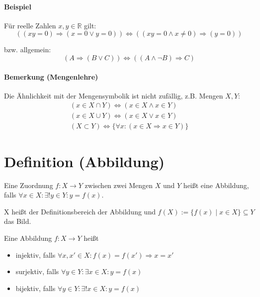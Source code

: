\paragraph{Beispiel}
	Für reelle Zahlen $x,y\in\mathbb{R}$ gilt:
	\begin{equation*}
		\left((xy = 0)\Rightarrow (x=0 \lor y=0)\right) \Leftrightarrow \left((xy=0 \land x \neq 0)\Rightarrow (y =0)\right)
	\end{equation*}
	
	bzw. allgemein:
	\begin{equation*}
		(A\Rightarrow (B\lor C))\Leftrightarrow ((A\land\lnot B)\Rightarrow C)
	\end{equation*}

\paragraph{Bemerkung (Mengenlehre)}
	Die Ähnlichkeit mit der Mengensymbolik ist nicht zufällig, z.B. Mengen $X, Y$:
	\begin{gather*}
		(x\in X\cap Y)\Leftrightarrow (x\in X\land x\in Y)\\
		(x\in X\cup Y)\Leftrightarrow (x\in X\lor x\in Y)\\
		(X\subset Y) \Leftrightarrow \{\forall x : (x\in X \Rightarrow x\in Y)\}
	\end{gather*}

\section*{Definition (Abbildung)}
	\begin{Definition}[Abbildung]
		Eine Zuordnung $f: X\to Y$ zwischen zwei Mengen $X$ und $Y$ heißt eine Abbildung, falls $\forall x\in X: \exists ! y\in Y: y=f(x)$.

	X heißt der Definitionsbereich der Abbildung und $f(X):=\{f(x)\mid x\in X \}\subseteq Y$ das Bild.

	Eine Abbildung $f: X\to Y$ heißt
	\begin{itemize}
		\item injektiv, falls $\forall x,x'\in X:f(x) = f(x') \Rightarrow x=x'$
		\item surjektiv, falls $\forall y\in Y:\exists x\in X: y = f(x)$
		\item bijektiv, falls $\forall y\in Y:\exists !x\in X: y = f(x)$
	\end{itemize}
	\end{Definition}

